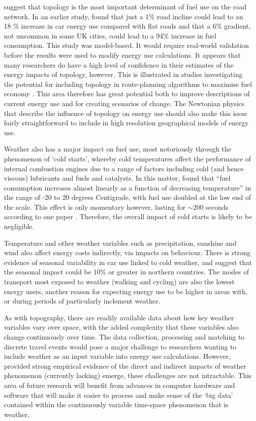  \citet{Park2011} suggest that topology is the most important determinant of
 fuel use on the road network. In an earlier study, \citet{park2006energy}
 found that just a 1\% road incline could lead to an 18 \% increase in
 car energy use compared with flat roads and that a 6\% gradient,
 not uncommon in some UK cities, could lead to a 94\% increase in fuel
 consumption. This study was model-based. It would require
 real-world validation before the results were used to modify energy use calculations.
 It appears that many researchers do have a high level of confidence in their
 estimates of the energy impacts of topology, however. This is illustrated in
  studies investigating the potential for including
 topology in route-planning algorithms to maximise fuel economy
 \citep{minett2011eco, ahn2011eco}. This area therefore has great potential
 both to improve descriptions of current energy use and for creating
 scenarios of change. The Newtonian physics that describe the influence of
 topology on energy use should also make this issue fairly straightforward to
 include in high resolution geographical models of energy use.

Weather also has a major impact on fuel use, most notoriously through the
phenomenon of `cold starts', whereby cold temperatures affect the performance
of internal combustion engines due to a range of factors including cold
(and hence viscous) lubricants and fuels and catalysts.
In this matter, \citet[2422]{Weilenmann2009cold} found that
``fuel consumption increases almost linearly as a function
of decreasing temperature'' in the range of -20 to 20 degrees Centigrade,
with fuel use doubled at the low end of the scale. This effect is only
momentary however, lasting for $\sim$200 seconds according to one
paper \citep{Singer1999coldstartemissions200}. Therefore, the overall impact
of cold starts is likely to be negligible.

Temperature and other weather variables such as precipitation, sunshine
and wind also affect energy costs indirectly, via impacts on behaviour.
There is strong evidence of seasonal variability in car use linked to cold
weather, and \citet{Schipper1993} suggest that the seasonal impact could be
10\% or greater in northern countries. The modes of transport most exposed to
weather (walking and cycling) are also the lowest energy users, another reason
for expecting energy use to be higher in areas with, or during periods of
particularly inclement weather.

As with topography, there are readily available data about how key weather variables
vary over space, with the added complexity that these variables also change
continuously over time. The data collection, processing and matching to
discrete travel events would pose a major challenge to
researchers wanting to include weather as an input variable into energy use
calculations. However, provided strong empirical evidence of the
direct and indirect impacts of weather phenomenon (currently lacking) emerge,
these challenges are not intractable. This area of future research will
benefit from advances in computer hardware and software that will make it
easier to process and make sense of the `big data' contained within
the continuously variable time-space phenomenon that is weather.

